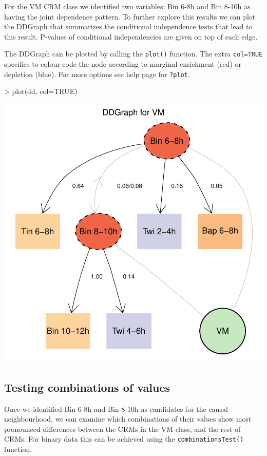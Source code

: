 \documentclass{article}
\newcommand{\Rfun}[1]{{\texttt{#1}}}
\newcommand{\Robj}[1]{{\texttt{#1}}}
\begin{document}
For the VM CRM class we identified two variables: Bin 6-8h and Bin 8-10h as having the joint dependence pattern. To further explore this results we can plot the DDGraph that summarizes the conditional independence tests that lead to this result. P-values of conditional independencies are given on top of each edge. 

The DDGraph can be plotted by calling the \Rfun{plot()} function. The extra \Robj{col=TRUE} specifies to colour-code the node according to marginal enrichment (red) or depletion (blue). For more options see help page for \Robj{?plot}. 

\begin{Schunk}
\begin{Sinput}
> plot(dd, col=TRUE)
\end{Sinput}
\end{Schunk}
\includegraphics{ddgraph-ddgraph-plot}

\subsection{Testing combinations of values}

Once we identified Bin 6-8h and Bin 8-10h as candidates for the causal neighbourhood, we can examine which combinations of their values show most pronounced differences between the CRMs in the VM class, and the rest of CRMs. For binary data this can be achieved using the \Rfun{combinationsTest()} function. 
\end{document}
